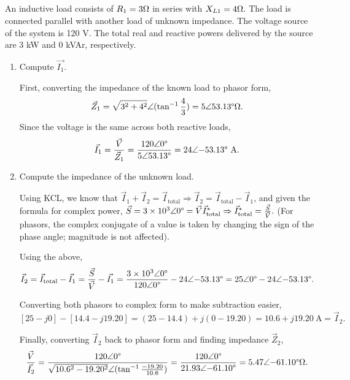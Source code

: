 \documentclass{article}
\begin{document}
\subsection{} An inductive load consists of \(R_1 = 3\ohm\) in series with \(X_{L1} = 4\ohm.\) The load is connected parallel with another load of unknown impedance. The voltage source of the system is 120 V. The total real and reactive powers delivered by the source are 3 kW and 0 kVAr, respectively.
\begin{enumerate}[label=\alph*)]
	\item Compute \(\vec{I_1}\).

		First, converting the impedance of the known load to phasor form, 
		\[
			\vec{Z}_1 = \sqrt{3^2+4^2} \angle{(\tan^{-1}{\frac{4}{3}}}) = 5\angle{53.13 \degree \ohm}.
		\]
		Since the voltage is the same across both reactive loads, 
		\[
			\vec{I}_1 = \frac{\vec{V}}{\vec{Z}_1} = \frac{120 \angle{0\degree}}{5\angle{53.13 \degree}} = 24\angle{-53.13 \degree} \ \mathrm{A}.
		\]
	\item Compute the impedance of the unknown load.

		Using KCL, we know that \(\vec{I}_1 + \vec{I}_2 = \vec{I}_{\mathrm{total}} \Rightarrow \vec{I}_2 = \vec{I}_{\mathrm{total}} - \vec{I}_1\), and given the formula for complex power, \(\vec{S} = 3\times10^3\angle{0\degree}=\vec{V}\vec{I}_{\mathrm{total}}^* \Rightarrow \vec{I}_{\mathrm{total}}^* = \frac{\vec{S}}{\vec{V}}.\) (For phasors, the complex conjugate of a value is taken by changing the sign of the phase angle; magnitude is not affected).

		Using the above, \[
	\vec{I}_{2} = \vec{I}_{\mathrm{total}} - \vec{I}_1 = \frac{\vec{S}}{\vec{V}} - \vec{I_1} = \frac{3\times10^3\angle{0\degree}}{120\angle{0\degree}} - 24\angle{-53.13\degree} = 25\angle{0\degree} - 24\angle{-53.13\degree}.
		\]

		Converting both phasors to complex form to make subtraction easier, \[
			[25-j0] - [14.4 - j19.20] = (25-14.4) + j(0-19.20) = 10.6 + j19.20 \ \mathrm{A} = \vec{I}_2. 
		\]

		Finally, converting \(\vec{I}_2\) back to phasor form and finding impedance \(\vec{Z}_2\), 
\[
			\frac{\vec{V}}{\vec{I}_2} = \frac{120\angle{0\degree}}{\sqrt{10.6^2 - 19.20^2}\angle(\tan^{-1}{\frac{-19.20}{10.6}})} = \frac{120\angle{0\degree}}{21.93\angle{-61.10\degree}} = 5.47\angle{-61.10\degree} \ohm.
\]
\end{enumerate}
\end{document}
